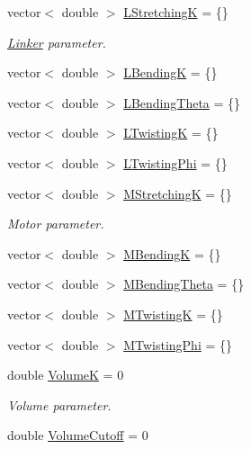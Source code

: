 {\bf }\par
\begin{DoxyCompactItemize}
\item 
vector$<$ double $>$ \hyperlink{structMechanicsParameters_aea1e85562167210db74aa3ffd0013bd7}{L\+Stretching\+K} = \{\}
\begin{DoxyCompactList}\small\item\em \hyperlink{classLinker}{Linker} parameter. \end{DoxyCompactList}\item 
vector$<$ double $>$ \hyperlink{structMechanicsParameters_a4538f8a7ee3c71f1eda540bc41614a55}{L\+Bending\+K} = \{\}
\item 
vector$<$ double $>$ \hyperlink{structMechanicsParameters_aab9d6facd9ba3939017117cd5bff60db}{L\+Bending\+Theta} = \{\}
\item 
vector$<$ double $>$ \hyperlink{structMechanicsParameters_a6629c1138e0a0662f6156fe67431f690}{L\+Twisting\+K} = \{\}
\item 
vector$<$ double $>$ \hyperlink{structMechanicsParameters_a8cc146be39259d4b1edd94b70d9b1832}{L\+Twisting\+Phi} = \{\}
\end{DoxyCompactItemize}

{\bf }\par
\begin{DoxyCompactItemize}
\item 
vector$<$ double $>$ \hyperlink{structMechanicsParameters_a36650ee6fc8a98f94b6594e67d4b34f5}{M\+Stretching\+K} = \{\}
\begin{DoxyCompactList}\small\item\em Motor parameter. \end{DoxyCompactList}\item 
vector$<$ double $>$ \hyperlink{structMechanicsParameters_abbc374692e6df3c7532e085918a98c4c}{M\+Bending\+K} = \{\}
\item 
vector$<$ double $>$ \hyperlink{structMechanicsParameters_a597e2027d01d684f5dfe90d8a2734a90}{M\+Bending\+Theta} = \{\}
\item 
vector$<$ double $>$ \hyperlink{structMechanicsParameters_a3efad448cc6428dcb081d2778655ec12}{M\+Twisting\+K} = \{\}
\item 
vector$<$ double $>$ \hyperlink{structMechanicsParameters_abff44b81c046945ed8277a522b741ac8}{M\+Twisting\+Phi} = \{\}
\end{DoxyCompactItemize}

{\bf }\par
\begin{DoxyCompactItemize}
\item 
double \hyperlink{structMechanicsParameters_a49a5ad4e84d9c8acafc8bd38018245d1}{Volume\+K} = 0
\begin{DoxyCompactList}\small\item\em Volume parameter. \end{DoxyCompactList}\item 
double \hyperlink{structMechanicsParameters_a597ef187ef21d3eca159e00264bf425c}{Volume\+Cutoff} = 0
\end{DoxyCompactItemize}



